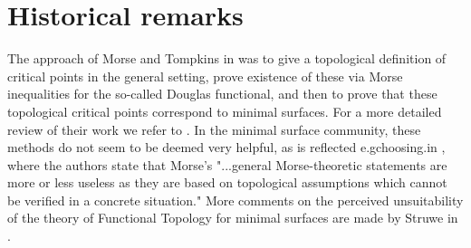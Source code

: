 
\section{Historical remarks} \label{s:historical}

The approach of Morse and Tompkins in \cite{Morse.1939} was to give a topological definition of critical points in the general setting, prove existence of these via Morse inequalities for the so-called Douglas functional, and then to prove that these topological critical points correspond to minimal surfaces. For a more detailed review of their work we refer to \cite{Struwe.1988}. In the minimal surface community, these methods do not seem to be deemed very helpful, as is reflected e.gchoosing.\@ in \cite[p.472]{MR2566897}, where the authors state that Morse's "...general Morse-theoretic statements are more or less useless as they are based on topological assumptions which cannot be verified in a concrete situation." More comments on the perceived unsuitability of the theory of Functional Topology for minimal surfaces are made by Struwe in \cite{MR850612}. 

